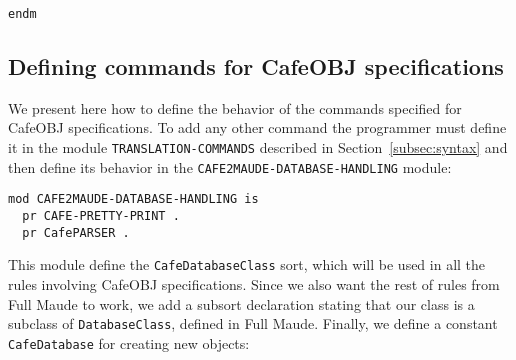{\codesize
\begin{comment}

The function \verb"printCafeAttS" is used to print the attributes in operator
declarations:
  op printCafeAttS : Term Module Database -> QidList .
  ceq printCafeAttS('__[T, T'], M, DB) = QIL QIL'
   if QIL := printCafeAttS(T, M, DB) /\
      QIL' := printCafeAttS(T', M, DB) .
  eq printCafeAttS('constr.@CafeAttr@, M, DB) = 'constr .
  eq printCafeAttS('associative.@CafeAttr@, M, DB) = 'associative .
  eq printCafeAttS('assoc.@CafeAttr@, M, DB) = 'assoc .
  eq printCafeAttS('l-assoc.@CafeAttr@, M, DB) = 'l-assoc .
  eq printCafeAttS('r-assoc.@CafeAttr@, M, DB) = 'r-assoc .
  eq printCafeAttS('commutative.@CafeAttr@, M, DB) = 'commutative .
  eq printCafeAttS('comm.@CafeAttr@, M, DB) = 'comm .
  eq printCafeAttS('idempotent.@CafeAttr@, M, DB) = 'idempotent .
  eq printCafeAttS('idem.@CafeAttr@, M, DB) = 'idem .
  eq printCafeAttS('nonexec.@CafeAttr@, M, DB) = 'nonexec .
  ceq printCafeAttS('prec:_['CafeToken[T]], M, DB) = 'prec: Q
   if Q := downQid(T) .
  ceq printCafeAttS('id:`(_`)['CafeBubble[T]], M, DB) = 'id: '`( QIL '`) '
   if T1 := solveBubbles('bubble[T], M, false, none, DB) /\
      QIL := metaPrettyPrint(M, T1, printOpts) .
  ceq printCafeAttS('idr:`(_`)['CafeBubble[T]], M, DB) = 'idr: '`( QIL '`) '
   if T1 := solveBubbles('bubble[T], M, false, none, DB) /\
      QIL := metaPrettyPrint(M, T1, printOpts) .
\end{comment}
}
{\codesize
\begin{verbatim}
endm
\end{verbatim}
}

\subsection{Defining commands for CafeOBJ specifications\label{subsec:cafe:commands}}

We present here how to define the behavior of the commands specified for CafeOBJ
specifications. To add any other command the programmer must define it in the module
\texttt{TRANSLATION-COMMANDS} described in Section~\ref{subsec:syntax} and then define
its behavior in
the \texttt{CAFE2MAUDE-DATABASE-HANDLING} module:

{\codesize
\begin{verbatim}
mod CAFE2MAUDE-DATABASE-HANDLING is
  pr CAFE-PRETTY-PRINT .
  pr CafePARSER .
\end{verbatim}
}

This module define the \verb"CafeDatabaseClass" sort, which will be used in all
the rules involving CafeOBJ specifications. Since we also want the rest of rules
from Full Maude to work, we add a subsort declaration stating that our class is
a subclass of \verb"DatabaseClass", defined in Full Maude. Finally, we define a
constant \texttt{CafeDatabase} for creating new objects:


